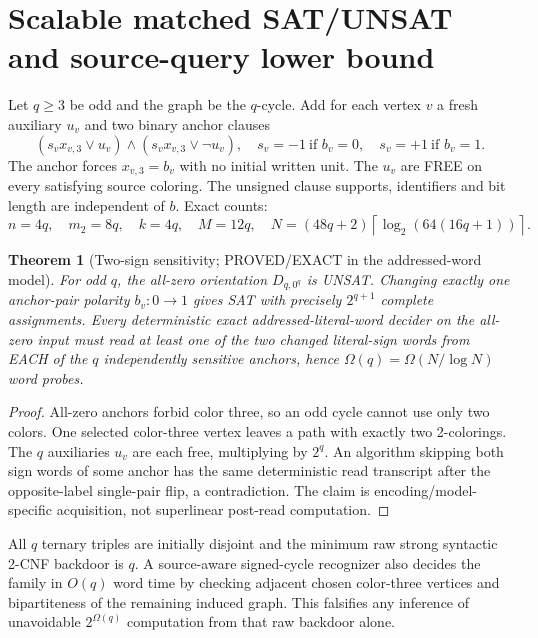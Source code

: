 \documentclass[11pt]{article}
\newtheorem{theorem}{Theorem}
\begin{document}
\section{Scalable matched SAT/UNSAT and source-query lower bound}
Let $q\ge3$ be odd and the graph be the $q$-cycle. Add for each vertex $v$ a fresh auxiliary $u_v$ and two binary anchor clauses
\[
(s_v x_{v,3}\vee u_v)\wedge(s_v x_{v,3}\vee\neg u_v),\quad
s_v=-1\ \text{if }b_v=0,\quad s_v=+1\ \text{if }b_v=1.
\]
The anchor forces $x_{v,3}=b_v$ with no initial written unit. The $u_v$ are FREE on every satisfying source coloring. The unsigned clause supports, identifiers and bit length are independent of $b$. Exact counts:
\[
\boxed{n=4q,\quad m_2=8q,\quad k=4q,\quad M=12q,\quad
N=(48q+2)\left\lceil\log_2(64(16q+1))\right\rceil.}
\]
\begin{theorem}[Two-sign sensitivity; PROVED/EXACT in the addressed-word model]
For odd $q$, the all-zero orientation $D_{q,0^q}$ is UNSAT. Changing exactly one anchor-pair polarity $b_v:0\to1$ gives SAT with precisely $2^{q+1}$ complete assignments. Every deterministic exact addressed-literal-word decider on the all-zero input must read at least one of the two changed literal-sign words from EACH of the $q$ independently sensitive anchors, hence $\Omega(q)=\Omega(N/\log N)$ word probes.
\end{theorem}
\begin{proof}
All-zero anchors forbid color three, so an odd cycle cannot use only two colors. One selected color-three vertex leaves a path with exactly two 2-colorings. The $q$ auxiliaries $u_v$ are each free, multiplying by $2^q$. An algorithm skipping both sign words of some anchor has the same deterministic read transcript after the opposite-label single-pair flip, a contradiction. The claim is encoding/model-specific acquisition, not superlinear post-read computation.
\end{proof}
All $q$ ternary triples are initially disjoint and the minimum raw strong syntactic 2-CNF backdoor is $q$. A source-aware signed-cycle recognizer also decides the family in $O(q)$ word time by checking adjacent chosen color-three vertices and bipartiteness of the remaining induced graph. This falsifies any inference of unavoidable $2^{\Omega(q)}$ computation from that raw backdoor alone.
\end{document}
